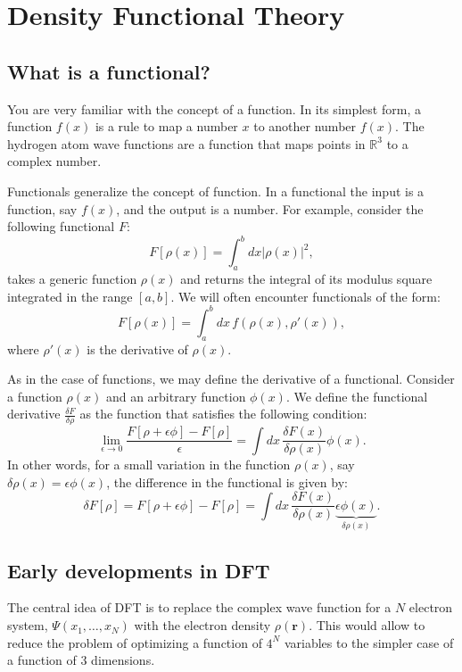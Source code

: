 \documentclass[../Main/chem532-notes.tex]{subfiles}
\begin{document}
\chapter{Density Functional Theory}

\section{What is a functional?}
You are very familiar with the concept of a function. In its simplest form, a function $f(x)$ is a rule to map a number $x$ to another number $f(x)$.
The hydrogen atom wave functions are a function that maps points in $\mathbb{R}^3$ to a complex number.

Functionals generalize the concept of function. In a functional the input is a function, say $f(x)$, and the output is a number.
For example, consider the following functional $F$:
\begin{equation}
F[\rho(x)] = \int_a^b dx |\rho(x)|^2,
\end{equation}
takes a generic function $\rho(x)$ and returns the integral of its modulus square integrated in the range $[a,b]$.
We will often encounter functionals of the form:
\begin{equation}
F[\rho(x)] = \int_a^b dx\,f(\rho(x),\rho'(x)),
\end{equation}
where $\rho'(x)$ is the derivative of $\rho(x)$.

As in the case of functions, we may define the derivative of a functional.
Consider a function $\rho(x)$ and an arbitrary function $\phi(x)$.
We define the functional derivative $\frac{\delta F}{\delta \rho}$ as the function that satisfies the following condition:
\begin{equation}
\lim_{\epsilon \rightarrow 0} \frac{F[\rho + \epsilon \phi] - F[\rho]}{\epsilon}
= \int dx \,\frac{\delta F(x)}{\delta \rho(x)} \phi(x).
\end{equation}
In other words, for a small variation in the function $\rho(x)$, say $\delta \rho(x) = \epsilon \phi(x)$, the difference in the functional is given by:
\begin{equation}
\delta F[\rho] = F[\rho + \epsilon \phi] - F[\rho] = \int dx \,\frac{\delta F(x)}{\delta \rho(x)} \underbrace{\epsilon \phi(x)}_{\delta \rho(x)}.
\end{equation}

\section{Early developments in DFT}
The central idea of DFT is to replace the complex wave function for a $N$ electron system, $\Psi(x_1,\ldots,x_N)$ with the electron density $\rho(\mathbf{r})$.
This would allow to reduce the problem of optimizing a function of $4^N$ variables to the simpler case of a function of 3 dimensions.
\end{document}
